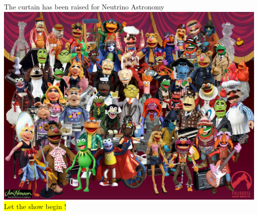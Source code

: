 \onecolumn
\begin{center}
{\blue The curtain has been raised for Neutrino Astronomy}\\[5mm]
\includegraphics[keepaspectratio,width=18cm]{muppets}\\
\colorbox{yellow}{Let the show begin !}
\end{center}
